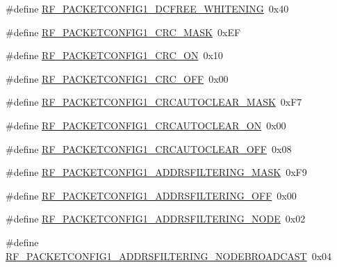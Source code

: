 \begin{DoxyCompactItemize}
\item 
\#define \mbox{\hyperlink{sx1276_regs-_fsk_8h_aca0b24d6db23ec11341111780a769c46}{R\+F\+\_\+\+P\+A\+C\+K\+E\+T\+C\+O\+N\+F\+I\+G1\+\_\+\+D\+C\+F\+R\+E\+E\+\_\+\+W\+H\+I\+T\+E\+N\+I\+NG}}~0x40
\item 
\#define \mbox{\hyperlink{sx1276_regs-_fsk_8h_ad7dcff9e6dc9092816aea02a997fbce2}{R\+F\+\_\+\+P\+A\+C\+K\+E\+T\+C\+O\+N\+F\+I\+G1\+\_\+\+C\+R\+C\+\_\+\+M\+A\+SK}}~0x\+EF
\item 
\#define \mbox{\hyperlink{sx1276_regs-_fsk_8h_ad7837efcf34cc8d322f9a6804d6862cc}{R\+F\+\_\+\+P\+A\+C\+K\+E\+T\+C\+O\+N\+F\+I\+G1\+\_\+\+C\+R\+C\+\_\+\+ON}}~0x10
\item 
\#define \mbox{\hyperlink{sx1276_regs-_fsk_8h_adadf61508b683e35a68324d98bf08ae7}{R\+F\+\_\+\+P\+A\+C\+K\+E\+T\+C\+O\+N\+F\+I\+G1\+\_\+\+C\+R\+C\+\_\+\+O\+FF}}~0x00
\item 
\#define \mbox{\hyperlink{sx1276_regs-_fsk_8h_a71ef80b56ede94b1e6f5216296a549a2}{R\+F\+\_\+\+P\+A\+C\+K\+E\+T\+C\+O\+N\+F\+I\+G1\+\_\+\+C\+R\+C\+A\+U\+T\+O\+C\+L\+E\+A\+R\+\_\+\+M\+A\+SK}}~0x\+F7
\item 
\#define \mbox{\hyperlink{sx1276_regs-_fsk_8h_ab08c36961942390a8d7bf306c3811bca}{R\+F\+\_\+\+P\+A\+C\+K\+E\+T\+C\+O\+N\+F\+I\+G1\+\_\+\+C\+R\+C\+A\+U\+T\+O\+C\+L\+E\+A\+R\+\_\+\+ON}}~0x00
\item 
\#define \mbox{\hyperlink{sx1276_regs-_fsk_8h_a5657b8ed002c1fa8240195094ae616d3}{R\+F\+\_\+\+P\+A\+C\+K\+E\+T\+C\+O\+N\+F\+I\+G1\+\_\+\+C\+R\+C\+A\+U\+T\+O\+C\+L\+E\+A\+R\+\_\+\+O\+FF}}~0x08
\item 
\#define \mbox{\hyperlink{sx1276_regs-_fsk_8h_aa6ade0d8733661fe9b5909e83f82ff8d}{R\+F\+\_\+\+P\+A\+C\+K\+E\+T\+C\+O\+N\+F\+I\+G1\+\_\+\+A\+D\+D\+R\+S\+F\+I\+L\+T\+E\+R\+I\+N\+G\+\_\+\+M\+A\+SK}}~0x\+F9
\item 
\#define \mbox{\hyperlink{sx1276_regs-_fsk_8h_ae1c5b653c3eaf3484aa55b58fcd6f4f0}{R\+F\+\_\+\+P\+A\+C\+K\+E\+T\+C\+O\+N\+F\+I\+G1\+\_\+\+A\+D\+D\+R\+S\+F\+I\+L\+T\+E\+R\+I\+N\+G\+\_\+\+O\+FF}}~0x00
\item 
\#define \mbox{\hyperlink{sx1276_regs-_fsk_8h_a5ead47f6e17c82b0ac7cb3d9c0f63f7c}{R\+F\+\_\+\+P\+A\+C\+K\+E\+T\+C\+O\+N\+F\+I\+G1\+\_\+\+A\+D\+D\+R\+S\+F\+I\+L\+T\+E\+R\+I\+N\+G\+\_\+\+N\+O\+DE}}~0x02
\item 
\#define \mbox{\hyperlink{sx1276_regs-_fsk_8h_aa303faf2ff47ba50805b1f4f51f6d012}{R\+F\+\_\+\+P\+A\+C\+K\+E\+T\+C\+O\+N\+F\+I\+G1\+\_\+\+A\+D\+D\+R\+S\+F\+I\+L\+T\+E\+R\+I\+N\+G\+\_\+\+N\+O\+D\+E\+B\+R\+O\+A\+D\+C\+A\+ST}}~0x04

\end{DoxyCompactItemize}
